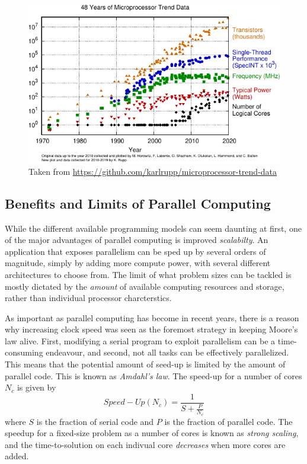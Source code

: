 \begin{figure}
\centering
\includegraphics[scale=1.2]{Pics/moore}
\caption{Taken from \protect\url{https://github.com/karlrupp/microprocessor-trend-data}}
\end{figure}

\subsection{Benefits and Limits of Parallel Computing}

While the different available programming models can seem daunting at first, one of the major advantages of parallel computing is improved \emph{scalabilty}. An application that exposes parallelism can be sped up by several orders of magnitude, simply by adding more compute power, with several different architectures to choose from. The limit of what problem sizes can be tackled is mostly dictated by the \emph{amount} of available computing resources and storage, rather than individual processor charcterstics.

As important as parallel computing has become in recent years, there is a reason why increasing clock speed was seen as the foremost strategy in keeping Moore's law alive. First, modifying a serial program to exploit parallelism can be a time-consuming endeavour, and second, not all tasks can be effectively parallelized. This means that the potential amount of seed-up is limited by the amount of parallel code. This is known as \emph{Amdahl's law}. The speed-up for a number of cores $N_c$ is given by
\begin{equation}
Speed-Up(N_c) = \frac{1}{S + \frac{P}{N_c}}
\end{equation}
\noindent where $S$ is the fraction of serial code and $P$ is the fraction of parallel code. The speedup for a fixed-size problem as a number of cores is known as \emph{strong scaling}, and the time-to-solution on each indivual core \emph{decreases} when more cores are added.

